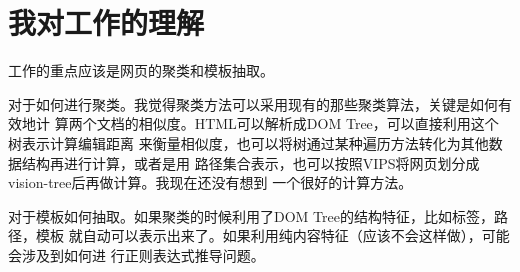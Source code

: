 \documentclass[a4paper]{article}
\begin{document}
\section{我对工作的理解}
\label{sec-3}

  工作的重点应该是网页的聚类和模板抽取。

  对于如何进行聚类。我觉得聚类方法可以采用现有的那些聚类算法，关键是如何有效地计
  算两个文档的相似度。HTML可以解析成DOM Tree，可以直接利用这个树表示计算编辑距离
  来衡量相似度，也可以将树通过某种遍历方法转化为其他数据结构再进行计算，或者是用
  路径集合表示，也可以按照VIPS将网页划分成vision-tree后再做计算。我现在还没有想到
  一个很好的计算方法。

  对于模板如何抽取。如果聚类的时候利用了DOM Tree的结构特征，比如标签，路径，模板
  就自动可以表示出来了。如果利用纯内容特征（应该不会这样做），可能会涉及到如何进
  行正则表达式推导问题。
\end{document}
